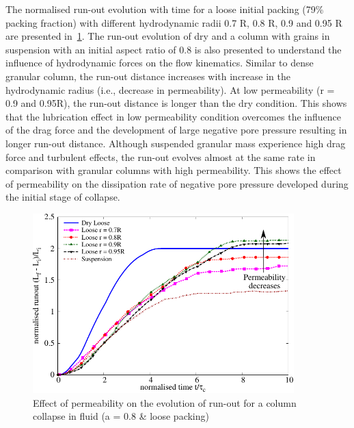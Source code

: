 The normalised run-out evolution with time for a loose initial packing (79\% 
packing fraction) with different hydrodynamic radii 0.7 R, 0.8 R, 0.9 and 0.95 
R are presented in~\cref{fig:Runout_a08_loose}. The run-out evolution of dry 
and a column with grains in suspension with an 
initial aspect ratio of 0.8 is also presented to understand the influence of 
hydrodynamic forces on the flow kinematics. Similar to dense granular column, 
the run-out distance increases with increase in the hydrodynamic radius (i.e., 
decrease in permeability). At low permeability (r = 0.9 and 0.95R), the run-out 
distance is longer than the dry condition. This shows that the lubrication 
effect in low permeability condition overcomes the influence of 
the drag force and the development of large negative pore pressure resulting in 
longer run-out distance. Although suspended granular mass experience high drag 
force and turbulent effects, the run-out evolves almost at the same rate in 
comparison with granular columns with high permeability. This shows the effect 
of permeability on the dissipation rate of negative pore pressure developed 
during the initial stage of collapse.

\begin{figure}
\centering
\includegraphics[width=0.9\textwidth]{Runout_a08_loose}
\caption{Effect of permeability on the evolution of run-out for a column 
collapse in fluid (a = 0.8 \& loose packing)}
\label{fig:Runout_a08_loose}
\end{figure}

